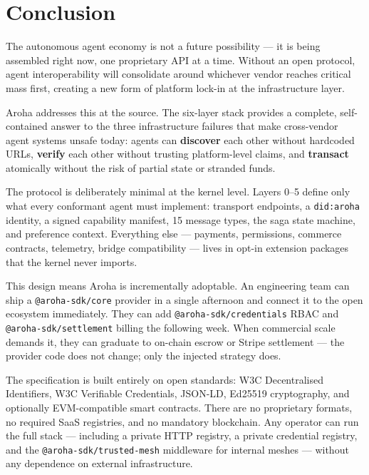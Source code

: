 \documentclass[11pt,a4paper]{article}
\begin{document}
\section{Conclusion}

The autonomous agent economy is not a future possibility --- it is being assembled
right now, one proprietary API at a time. Without an open protocol, agent
interoperability will consolidate around whichever vendor reaches critical mass
first, creating a new form of platform lock-in at the infrastructure layer.

Aroha addresses this at the source. The six-layer stack provides a complete,
self-contained answer to the three infrastructure failures that make cross-vendor
agent systems unsafe today: agents can \textbf{discover} each other without
hardcoded URLs, \textbf{verify} each other without trusting platform-level claims,
and \textbf{transact} atomically without the risk of partial state or stranded funds.

The protocol is deliberately minimal at the kernel level. Layers 0--5 define
only what every conformant agent must implement: transport endpoints, a
\texttt{did:aroha} identity, a signed capability manifest, 15 message types, the
saga state machine, and preference context. Everything else --- payments,
permissions, commerce contracts, telemetry, bridge compatibility --- lives in
opt-in extension packages that the kernel never imports.

This design means Aroha is incrementally adoptable. An engineering team can ship
a \texttt{@aroha-sdk/core} provider in a single afternoon and connect it to the open
ecosystem immediately. They can add \texttt{@aroha-sdk/credentials} RBAC and
\texttt{@aroha-sdk/settlement} billing the following week. When commercial scale
demands it, they can graduate to on-chain escrow or Stripe settlement --- the
provider code does not change; only the injected strategy does.

The specification is built entirely on open standards: W3C Decentralised
Identifiers, W3C Verifiable Credentials, JSON-LD, Ed25519 cryptography, and
optionally EVM-compatible smart contracts. There are no proprietary formats,
no required SaaS registries, and no mandatory blockchain. Any operator can run
the full stack --- including a private HTTP registry, a private credential
registry, and the \texttt{@aroha-sdk/trusted-mesh} middleware for internal meshes ---
without any dependence on external infrastructure.
\end{document}
